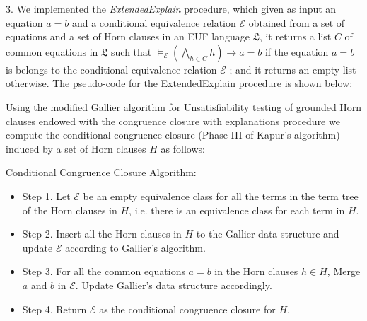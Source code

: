 



3. We implemented the \emph{ExtendedExplain}
procedure, which given as input an equation $a = b$ and a
conditional equivalence relation $\mathcal{E}$ obtained
from a set of equations and a set of Horn clauses
in an EUF language $\mathfrak{L}$,
it returns a list $C$ of common equations in $\mathfrak{L}$
such that
$\models_{\mathcal{E}} (\bigwedge_{h \in C} h) \rightarrow a = b$
if the equation $a = b$ is belongs to the 
conditional equivalence relation $\mathcal{E}$ ; 
and it returns an empty list
otherwise. 
The pseudo-code
for the ExtendedExplain procedure is shown 
below:




Using the modified Gallier algorithm for Unsatisfiability testing of
grounded Horn clauses endowed with the congruence
closure with explanations procedure we compute the conditional
congruence closure (Phase III of Kapur's algorithm) induced
by a set of Horn clauses $H$ as follows:

Conditional Congruence Closure Algorithm: \label{ccc_algorithm} \\
\begin{itemize} 
  \item[] Step 1. Let $\mathcal{E}$ be an empty equivalence class
    for all the terms in the term tree of the Horn clauses in $H$,
    i.e. there is an equivalence class for each term in $H$.

  \item[] Step 2. Insert all the Horn clauses in $H$ to the Gallier
    data structure and update $\mathcal{E}$ according to Gallier's
    algorithm.

  \item[] Step 3. For all the common equations $a = b$ 
    in the Horn clauses $h \in H$, Merge $a$ and $b$ in 
    $\mathcal{E}$. Update Gallier's data structure
    accordingly.

  \item[] Step 4. Return $\mathcal{E}$ as the conditional
    congruence closure for $H$.
\end{itemize}


